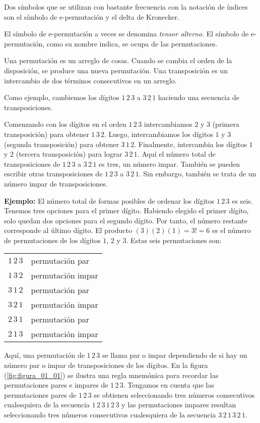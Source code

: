 Dos símbolos que se utilizan con bastante frecuencia con la notación de índices son el símbolo de e-permutación y el delta de Kronecker.
\par
El símbolo de e-permutación a veces se denomina \emph{tensor alterno}. El símbolo de e-permutación, como su nombre indica, se ocupa de las permutaciones.
\par
Una permutación es un arreglo de cosas. Cuando se cambia el orden de la disposición, se produce una nueva permutación. Una transposición es un intercambio de dos términos consecutivos en un arreglo.
\par
Como ejemplo, cambiemos los dígitos $1 \, 2 \, 3$ a $3 \, 2 \, 1$ haciendo una secuencia de transposiciones.
\par
Comenzando con los dígitos en el orden $1 \, 2 \, 3$ intercambiamos $2$ y $3$ (primera transposición) para obtener $1 \, 3 \, 2$. Luego, intercambiamos los dígitos $1$ y $3$ (segunda transposición) para obtener $3 \, 1 \, 2$. Finalmente, intercambia los dígitos $1$ y $2$ (tercera transposición) para lograr $3 \, 2 \, 1$. Aquí el número total de transposiciones de $1 \, 2 \, 3$ a $3 \, 2 \, 1$ es tres, un número impar. También se pueden escribir otras transposiciones de $1 \, 2 \, 3$ a $3 \, 2 \, 1$. Sin embargo, también se trata de un número impar de transposiciones.
\par
\noindent
\textbf{Ejemplo: } El número total de formas posibles de ordenar los dígitos $1 \, 2 \, 3$ es seis. Tenemos tres opciones para el primer dígito. Habiendo elegido el primer dígito, solo quedan dos opciones para el segundo dígito. Por tanto, el número restante corresponde al último dígito. El producto $(3) (2) (1) = 3! = 6$ es el número de permutaciones de los dígitos $1$, $2$ y $3$. Estas seis permutaciones son:
\begin{table}[H]
\large
\centering
\begin{tabular}{c l}
$1 \, 2 \, 3$ & permutación par \\
$1 \, 3 \, 2$ & permutación impar \\
$3 \, 1 \, 2$ & permutación par \\
$3 \, 2 \, 1$ & permutación impar \\
$2 \, 3 \, 1$ & permutación par \\
$2 \, 1 \, 3$ & permutación impar \\
\end{tabular}
\end{table}
Aquí, una permutación de $1 \, 2 \, 3$ se llama par o impar dependiendo de si hay un número par o impar de transposiciones de los dígitos. En la figura (\ref{fig:figura_01_01}) se ilustra una regla mnemónica para recordar las permutaciones pares e impares de $1 \, 2 \, 3$. Tengamos en cuenta que las permutaciones pares de $1 \, 2 \, 3$ se obtienen seleccionando tres números consecutivos cualesquiera de la secuencia $1 \, 2 \, 3\, 1 \, 2 \, 3$ y las permutaciones impares resultan seleccionando tres números consecutivos cualesquiera de la secuencia $3 \, 2 \, 1 \, 3 \, 2 \, 1$.

